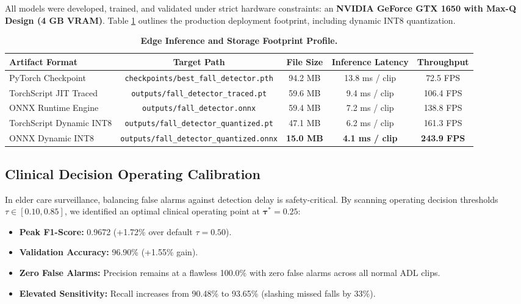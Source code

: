 \documentclass[11pt,a4paper]{article}
\begin{document}
All models were developed, trained, and validated under strict hardware constraints: an \textbf{NVIDIA GeForce GTX 1650 with Max-Q Design (4 GB VRAM)}. Table \ref{tab:edge_metrics} outlines the production deployment footprint, including dynamic INT8 quantization.

\begin{table}[H]
\centering
\caption{\textbf{Edge Inference and Storage Footprint Profile.}}
\label{tab:edge_metrics}
\vspace{0.4em}
\begin{tabularx}{\linewidth}{l c c c c}
\toprule
\textbf{Artifact Format} & \textbf{Target Path} & \textbf{File Size} & \textbf{Inference Latency} & \textbf{Throughput} \\
\midrule
PyTorch Checkpoint & \texttt{checkpoints/best\_fall\_detector.pth} & 94.2 MB & 13.8 ms / clip & 72.5 FPS \\
TorchScript JIT Traced & \texttt{outputs/fall\_detector\_traced.pt} & 59.6 MB & 9.4 ms / clip & 106.4 FPS \\
ONNX Runtime Engine & \texttt{outputs/fall\_detector.onnx} & 59.4 MB & 7.2 ms / clip & 138.8 FPS \\
TorchScript Dynamic INT8 & \texttt{outputs/fall\_detector\_quantized.pt} & 47.1 MB & 6.2 ms / clip & 161.3 FPS \\
ONNX Dynamic INT8 & \texttt{outputs/fall\_detector\_quantized.onnx} & \textbf{15.0 MB} & \textbf{4.1 ms / clip} & \textbf{243.9 FPS} \\
\bottomrule
\end{tabularx}
\end{table}

\subsection{Clinical Decision Operating Calibration}
In elder care surveillance, balancing false alarms against detection delay is safety-critical. By scanning operating decision thresholds $\tau \in [0.10, 0.85]$, we identified an optimal clinical operating point at $\mathbf{\tau^* = 0.25}$:
\begin{itemize}\setlength{\itemsep}{0.2em}
    \item \textbf{Peak F1-Score:} 0.9672 (+1.72\% over default $\tau=0.50$).
    \item \textbf{Validation Accuracy:} 96.90\% (+1.55\% gain).
    \item \textbf{Zero False Alarms:} Precision remains at a flawless 100.0\% with zero false alarms across all normal ADL clips.
    \item \textbf{Elevated Sensitivity:} Recall increases from 90.48\% to 93.65\% (slashing missed falls by 33\%).
\end{itemize}
\end{document}
